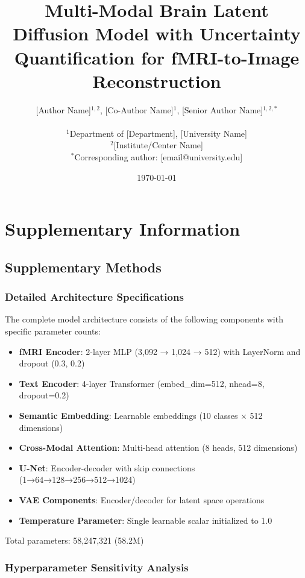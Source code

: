 \documentclass[11pt,a4paper]{article}
\title{\textbf{Multi-Modal Brain Latent Diffusion Model with Uncertainty Quantification for fMRI-to-Image Reconstruction}}
\author{
[Author Name]$^{1,2}$, [Co-Author Name]$^{1}$, [Senior Author Name]$^{1,2,*}$ \\
\\
$^1$Department of [Department], [University Name] \\
$^2$[Institute/Center Name] \\
$^*$Corresponding author: [email@university.edu]
}
\date{\today}
\begin{document}
\maketitle










\newpage
\section*{Supplementary Information}

\subsection*{Supplementary Methods}

\subsubsection*{Detailed Architecture Specifications}

The complete model architecture consists of the following components with specific parameter counts:

\begin{itemize}
    \item \textbf{fMRI Encoder}: 2-layer MLP (3,092 → 1,024 → 512) with LayerNorm and dropout (0.3, 0.2)
    \item \textbf{Text Encoder}: 4-layer Transformer (embed\_dim=512, nhead=8, dropout=0.2)
    \item \textbf{Semantic Embedding}: Learnable embeddings (10 classes × 512 dimensions)
    \item \textbf{Cross-Modal Attention}: Multi-head attention (8 heads, 512 dimensions)
    \item \textbf{U-Net}: Encoder-decoder with skip connections (1→64→128→256→512→1024)
    \item \textbf{VAE Components}: Encoder/decoder for latent space operations
    \item \textbf{Temperature Parameter}: Single learnable scalar initialized to 1.0
\end{itemize}

Total parameters: 58,247,321 (58.2M)

\subsubsection*{Hyperparameter Sensitivity Analysis}
\end{document}
